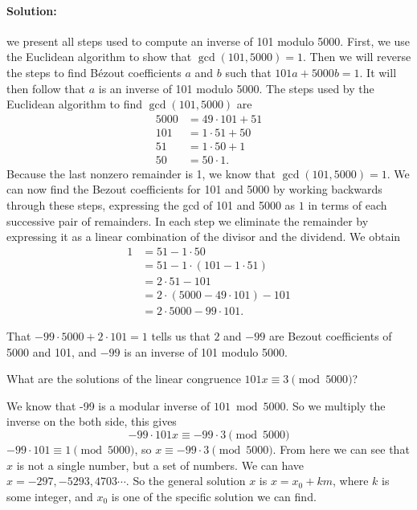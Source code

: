         \paragraph{Solution:}
we present all steps used to compute an inverse of 101 modulo 5000. First, we use the Euclidean algorithm to show that $\gcd(101, 5000) = 1$. Then we will reverse the steps to find B\'ezout coefficients $a$ and $b$ such that $101a + 5000b = 1$. It will then follow that $a$ is an inverse of 101 modulo 5000. The steps used by the Euclidean algorithm to find $\gcd(101, 5000)$ are
\begin{align*}
5000 &= 49 \cdot 101 + 51 \\
101 &= 1 \cdot 51 + 50 \\
51 &= 1 \cdot 50 + 1 \\
50 &= 50 \cdot 1.
\end{align*}
Because the last nonzero remainder is 1, we know that $\gcd(101, 5000) = 1$. We can now find the Bezout coefficients for 101 and 5000 by working backwards through these steps, expressing the gcd of 101 and 5000 as $1$ in terms of each successive pair of remainders. In each step we eliminate the remainder by expressing it as a linear combination of the divisor and the dividend. We obtain
\begin{align*}
1 &= 51 - 1 \cdot 50 \\
&= 51 - 1 \cdot (101 - 1 \cdot 51) \\
&= 2 \cdot 51 - 101 \\
&= 2 \cdot (5000 - 49 \cdot 101) - 101 \\
&= 2 \cdot 5000 - 99 \cdot 101.
\end{align*}

That $-99 \cdot 5000 + 2 \cdot 101 = 1$ tells us that $2$ and $-99$ are Bezout coefficients of 5000 and 101, and $-99$ is an inverse of 101 modulo 5000.
    \begin{example}
        What are the solutions of the linear congruence $101x \equiv 3 \pmod {5000}$?
    \end{example}
    We know that -99 is a modular inverse of $101 \bmod 5000$. So we multiply the inverse on the both
    side, this gives
    $$-99 \cdot 101x \equiv -99\cdot 3 \pmod {5000} $$
    $-99\cdot 101 \equiv 1 \pmod{5000}$, so $x\equiv -99 \cdot3 \pmod{5000}$.
    From here we can see that $x$ is not a single number, but a set of numbers. We can have$x = -297, -5293, 4703\cdots$.
    So the general solution $x$ is $x = x_0 + km$, where $k$ is some integer, and $x_0$ is one of the specific solution we can
    find.

